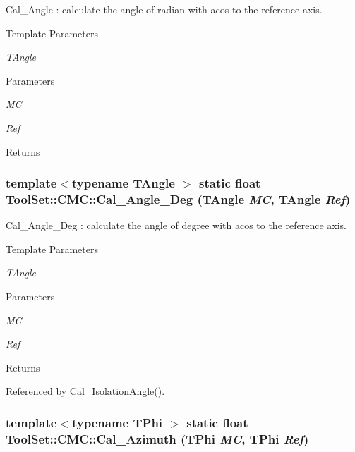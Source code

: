 Cal\_\-Angle : calculate the angle of radian with acos to the reference axis. 
\begin{DoxyTemplParams}{Template Parameters}
\item[{\em TAngle}]\end{DoxyTemplParams}

\begin{DoxyParams}{Parameters}
\item[{\em MC}]\item[{\em Ref}]\end{DoxyParams}
\begin{DoxyReturn}{Returns}

\end{DoxyReturn}
\hypertarget{classToolSet_1_1CMC_a58389b8e6c06afb39377d6d078e5616f}{
\subsubsection[{Cal\_\-Angle\_\-Deg}]{\setlength{\rightskip}{0pt plus 5cm}template$<$typename TAngle $>$ static float ToolSet::CMC::Cal\_\-Angle\_\-Deg (TAngle {\em MC}, \/  TAngle {\em Ref})}}
\label{classToolSet_1_1CMC_a58389b8e6c06afb39377d6d078e5616f}


Cal\_\-Angle\_\-Deg : calculate the angle of degree with acos to the reference axis. 
\begin{DoxyTemplParams}{Template Parameters}
\item[{\em TAngle}]\end{DoxyTemplParams}

\begin{DoxyParams}{Parameters}
\item[{\em MC}]\item[{\em Ref}]\end{DoxyParams}
\begin{DoxyReturn}{Returns}

\end{DoxyReturn}


Referenced by Cal\_\-IsolationAngle().\hypertarget{classToolSet_1_1CMC_ab77fa5dd46a12ac8887776724261f72b}{
\subsubsection[{Cal\_\-Azimuth}]{\setlength{\rightskip}{0pt plus 5cm}template$<$typename TPhi $>$ static float ToolSet::CMC::Cal\_\-Azimuth (TPhi {\em MC}, \/  TPhi {\em Ref})}}
\label{classToolSet_1_1CMC_ab77fa5dd46a12ac8887776724261f72b}


